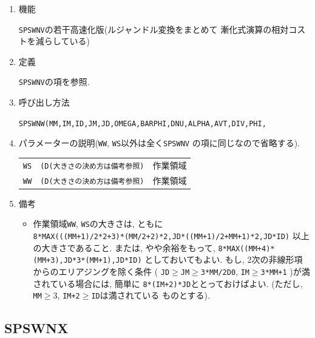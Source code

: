 \documentclass[a4j,fleqn]{jarticle}
\begin{document}
\begin{enumerate}

\item 機能

{\tt SPSWNV}の若干高速化版(ルジャンドル変換をまとめて
漸化式演算の相対コストを減らしている)

\item 定義

{\tt SPSWNV}の項を参照.

\item 呼び出し方法 

{\tt SPSWNW(MM,IM,ID,JM,JD,OMEGA,BARPHI,DNU,ALPHA,AVT,DIV,PHI,}\\
\hspace*{10em}{\tt DAVT,DDIV,DPHI,RN,IRM,IT,T,Y,IP,P,R,IA,A,Q,WS,WW)}
  
\item パラメーターの説明({\tt WW}, {\tt WS}以外は全く{\tt SPSWNV}
の項に同じなので省略する).

\begin{tabular}{lll}
{\tt WS}  & {\tt (D(大きさの決め方は備考参照)} & 作業領域\\
{\tt WW}  & {\tt (D(大きさの決め方は備考参照)} & 作業領域
\end{tabular}

\item 備考

\begin{itemize}

\item 作業領域{\tt WW}, {\tt WS}の大きさは, ともに\\
     {\tt 8*MAX(((MM+1)/2*2+3)*(MM/2+2)*2,JD*((MM+1)/2+MM+1)*2,JD*ID)}
    以上の大きさであること. または, やや余裕をもって,
     {\tt 8*MAX((MM+4)*(MM+3),JD*3*(MM+1),JD*ID)}
    としておいてもよい. もし, 2次の非線形項からのエリアジングを除く条件
     ( {\tt JD}$\ge${\tt JM}$\ge${\tt 3*MM/2D0}, 
      {\tt IM}$\ge${\tt 3*MM+1} )が満されている場合には, 簡単に
      {\tt 8*(IM+2)*JD}ととっておけばよい.
     (ただし, {\tt MM}$\ge 3$, {\tt IM+2}$\ge${\tt ID}は満されている
    ものとする).

\end{itemize}

\end{enumerate}


\subsection{SPSWNX}
\end{document}
